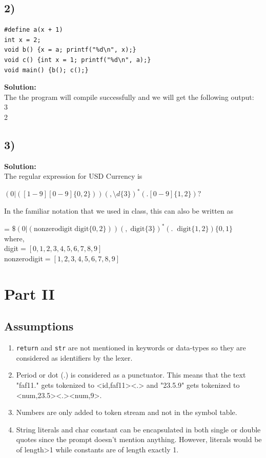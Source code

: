 \documentclass[12pt]{article}
\begin{document}
\subsection{2)}
 \begin{lstlisting}[style={c-style}]
#define a(x + 1)
int x = 2;
void b() {x = a; printf("%d\n", x);}
void c() {int x = 1; printf("%d\n", a);}
void main() {b(); c();}
\end{lstlisting}
\begin{framed}
\textbf{Solution:}\\
The the program will compile successfully and we will get the following output:\\
3\\
2\\

\end{framed}
\subsection{3)}
\begin{framed}
\textbf{Solution:}\\
The regular expression for USD Currency is
\begin{center}
    
$(0|([1-9][0-9]\{0,2\}))(,\setminus d\{3\})^*(.[0-9]\{1,2\})?$

\end{center}
In the familiar notation that we used in class, this can also be written as
\begin{center}
    = $\$(0 |(\text{nonzerodigit} \; \text{digit}\{0,2\}))(, \; \text{digit}\{3\})^*(. \;\; \text{digit}\{1,2\})\{0,1\}$\\
    where,\\
    digit$=[0,1,2,3,4,5,6,7,8,9]$\\
    nonzerodigit$=[1,2,3,4,5,6,7,8,9]$
    
    
\end{center}
\end{framed}

\section{Part II}
\subsection{Assumptions}
\begin{enumerate}
    \item \texttt{return} and \texttt{str} are not mentioned in keywords or data-types so they are considered as identifiers by the lexer.
    \item Period or dot (.) is considered as a punctuator. This means that the text "faf11." gets tokenized to <id,faf11><.> and "23.5.9" gets tokenized to <num,23.5><.><num,9>.
    \item Numbers are only added to token stream and not in the symbol table.
    \item String literals and char constant can be encapsulated in both single or double quotes since the prompt doesn't mention anything. However, literals would be of length>1 while constants are of length exactly 1.
\end{enumerate}
\end{document}
